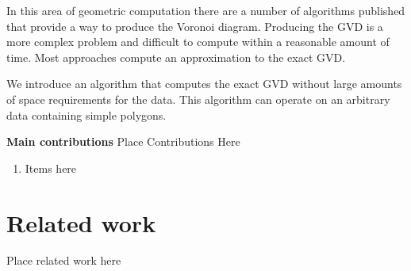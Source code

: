\documentclass{egpubl}
\renewcommand{\paragraph}[1]{\noindent \textbf{#1}}
\begin{document}
In this area of geometric computation there are a number of algorithms published that provide a way to produce the Voronoi diagram. Producing the GVD is a more complex problem and difficult to compute within a reasonable amount of time. Most approaches compute an approximation to the exact GVD. 

We introduce an algorithm that computes the exact GVD without large amounts of space requirements for the data. This algorithm can operate on an arbitrary data containing simple polygons. 



\paragraph{Main contributions} Place Contributions Here 

\begin{enumerate}
\item Items here
\end{enumerate}


\section{Related work}
Place related work here
\end{document}

